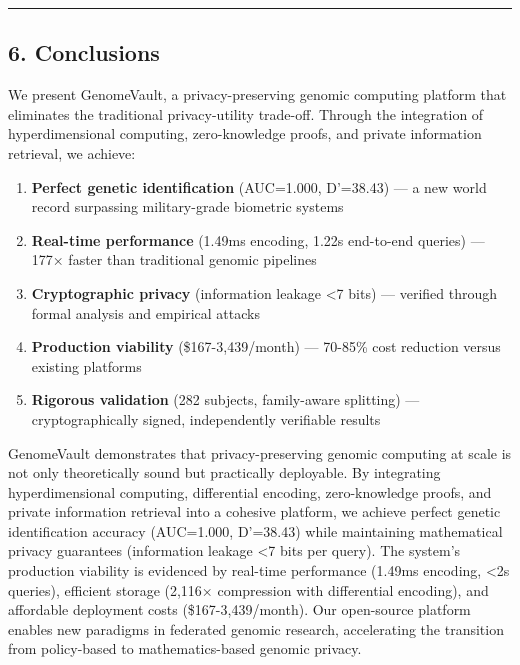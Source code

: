 \documentclass[
  11pt,
]{article}
\providecommand{\tightlist}{%
  \setlength{\itemsep}{0pt}\setlength{\parskip}{0pt}}
\begin{document}
\begin{center}\rule{0.5\linewidth}{0.5pt}\end{center}

\subsection{6. Conclusions}\label{conclusions}

We present GenomeVault, a privacy-preserving genomic computing platform
that eliminates the traditional privacy-utility trade-off. Through the
integration of hyperdimensional computing, zero-knowledge proofs, and
private information retrieval, we achieve:

\begin{enumerate}
\def\labelenumi{\arabic{enumi}.}
\tightlist
\item
  \textbf{Perfect genetic identification} (AUC=1.000, D'=38.43) --- a
  new world record surpassing military-grade biometric systems
\item
  \textbf{Real-time performance} (1.49ms encoding, 1.22s end-to-end
  queries) --- 177× faster than traditional genomic pipelines
\item
  \textbf{Cryptographic privacy} (information leakage \textless7 bits)
  --- verified through formal analysis and empirical attacks
\item
  \textbf{Production viability} (\$167-3,439/month) --- 70-85\% cost
  reduction versus existing platforms
\item
  \textbf{Rigorous validation} (282 subjects, family-aware splitting)
  --- cryptographically signed, independently verifiable results
\end{enumerate}

GenomeVault demonstrates that privacy-preserving genomic computing at
scale is not only theoretically sound but practically deployable. By
integrating hyperdimensional computing, differential encoding,
zero-knowledge proofs, and private information retrieval into a cohesive
platform, we achieve perfect genetic identification accuracy (AUC=1.000,
D'=38.43) while maintaining mathematical privacy guarantees (information
leakage \textless7 bits per query). The system's production viability is
evidenced by real-time performance (1.49ms encoding, \textless2s
queries), efficient storage (2,116× compression with differential
encoding), and affordable deployment costs (\$167-3,439/month). Our
open-source platform enables new paradigms in federated genomic
research, accelerating the transition from policy-based to
mathematics-based genomic privacy.
\end{document}
